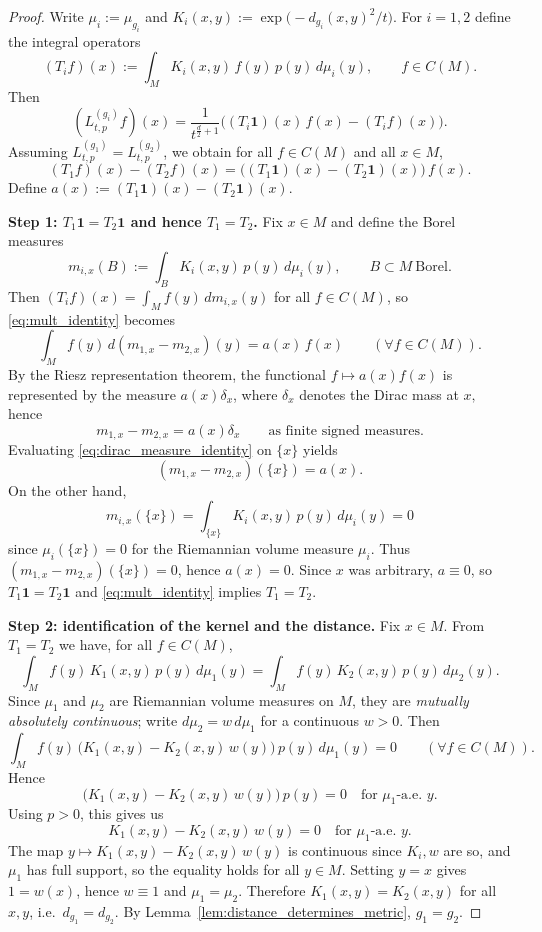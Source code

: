 \documentclass{amsart}
\theoremstyle{definition}
\theoremstyle{remark}
\newcommand{\0}{\boldsymbol{0}}
\begin{document}
\begin{proof}
Write $\mu_i:=\mu_{g_i}$ and $K_i(x,y):=\exp\!\big(-d_{g_i}(x,y)^2/t\big)$.
For $i=1,2$ define the integral operators
\[
(T_i f)(x):=\int_M K_i(x,y)\,f(y)\,p(y)\,d\mu_i(y),
\qquad f\in C(M).
\]
Then
\[
(L^{(g_i)}_{t,p} f)(x)=\frac{1}{t^{\frac d2+1}}\Big( (T_i \mathbf 1)(x)\,f(x) - (T_i f)(x)\Big).
\]
Assuming $L^{(g_1)}_{t,p}=L^{(g_2)}_{t,p}$, we obtain for all $f\in C(M)$ and all $x\in M$,
\begin{equation}
\label{eq:mult_identity}
(T_1 f)(x)-(T_2 f)(x)=\big((T_1\mathbf 1)(x)-(T_2\mathbf 1)(x)\big)\,f(x).
\end{equation}
Define $a(x):=(T_1\mathbf 1)(x)-(T_2\mathbf 1)(x)$.

\smallskip
\noindent\textbf{Step 1: $T_1\mathbf 1=T_2\mathbf 1$ and hence $T_1=T_2$.}
Fix $x\in M$ and define the Borel measures
\[
m_{i,x}(B):=\int_B K_i(x,y)\,p(y)\,d\mu_i(y),
\qquad B\subset M\ \text{Borel}.
\]
Then $(T_i f)(x)=\int_M f(y)\,dm_{i,x}(y)$ for all $f\in C(M)$, so \eqref{eq:mult_identity} becomes
\[
\int_M f(y)\,d(m_{1,x}-m_{2,x})(y)=a(x)\,f(x)
\qquad(\forall f\in C(M)).
\]
By the Riesz representation theorem, the functional $f\mapsto a(x)f(x)$ is represented by the
measure $a(x)\delta_x$, where $\delta_x$ denotes the Dirac mass at $x,$ hence
\begin{equation}
\label{eq:dirac_measure_identity}
m_{1,x}-m_{2,x}=a(x)\delta_x
\qquad\text{as finite signed measures.}
\end{equation}
Evaluating \eqref{eq:dirac_measure_identity} on $\{x\}$ yields
\[
(m_{1,x}-m_{2,x})(\{x\})=a(x).
\]
On the other hand,
\[
m_{i,x}(\{x\})=\int_{\{x\}} K_i(x,y)\,p(y)\,d\mu_i(y)=0
\]
since $\mu_i(\{x\})=0$ for the Riemannian volume measure $\mu_i$.
Thus $(m_{1,x}-m_{2,x})(\{x\})=0$, hence $a(x)=0$.
Since $x$ was arbitrary, $a\equiv 0$, so $T_1\mathbf 1=T_2\mathbf 1$ and \eqref{eq:mult_identity}
implies $T_1=T_2$.

\smallskip
\noindent\textbf{Step 2: identification of the kernel and the distance.}
Fix $x\in M$. From $T_1=T_2$ we have, for all $f\in C(M)$,
\[
\int_M f(y)\,K_1(x,y)\,p(y)\,d\mu_1(y)=\int_M f(y)\,K_2(x,y)\,p(y)\,d\mu_2(y).
\]
Since $\mu_1$ and $\mu_2$ are Riemannian volume measures on $M$,  they are \textit{mutually absolutely
continuous}; write $d\mu_2=w\,d\mu_1$ for a continuous $w>0$. Then
\[
\int_M f(y)\,\big(K_1(x,y)-K_2(x,y)\,w(y)\big)\,p(y)\,d\mu_1(y)=0
\qquad(\forall f\in C(M)).
\]
Hence
\[
\big(K_1(x,y)-K_2(x,y)\,w(y)\big)\,p(y)=0
\quad\text{for $\mu_1$-a.e.\ }y.
\]
Using $p>0$, this gives us
\[
K_1(x,y)-K_2(x,y)\,w(y)=0
\quad\text{for $\mu_1$-a.e.\ }y.
\]
The map $y\mapsto K_1(x,y)-K_2(x,y)\,w(y)$ is continuous since $K_i, w$ are so, and $\mu_1$ has full support,
so the equality holds for all $y\in M$. Setting $y=x$ gives $1=w(x)$, hence $w\equiv 1$ and
$\mu_1=\mu_2$. Therefore $K_1(x,y)=K_2(x,y)$ for all $x,y$, i.e.\ $d_{g_1}=d_{g_2}$.
By Lemma~\ref{lem:distance_determines_metric}, $g_1=g_2$.
\end{proof}
\end{document}
